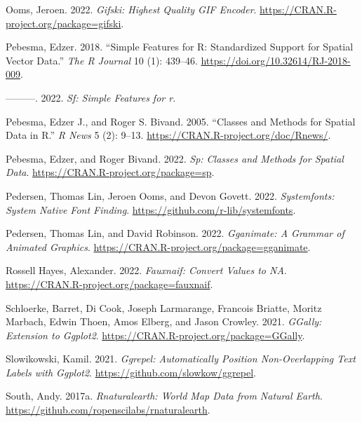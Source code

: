 \documentclass[
]{article}
\newlength{\cslhangindent}
\newlength{\cslentryspacingunit} %
\newenvironment{CSLReferences}[2] %
 {%
  \setlength{\parindent}{0pt}
  \ifodd #1
  \let\oldpar\par
  \def\par{\hangindent=\cslhangindent\oldpar}
  \fi
  \setlength{\parskip}{#2\cslentryspacingunit}
 }%
 {}
\begin{document}
\begin{CSLReferences}{1}{0}
\leavevmode{}%
Ooms, Jeroen. 2022. \emph{Gifski: Highest Quality GIF Encoder}.
\url{https://CRAN.R-project.org/package=gifski}.

\leavevmode{}%
Pebesma, Edzer. 2018. {``{Simple Features for R: Standardized Support
for Spatial Vector Data}.''} \emph{{The R Journal}} 10 (1): 439--46.
\url{https://doi.org/10.32614/RJ-2018-009}.

\leavevmode{}%
---------. 2022. \emph{Sf: Simple Features for r}.

\leavevmode{}%
Pebesma, Edzer J., and Roger S. Bivand. 2005. {``Classes and Methods for
Spatial Data in {R}.''} \emph{R News} 5 (2): 9--13.
\url{https://CRAN.R-project.org/doc/Rnews/}.

\leavevmode{}%
Pebesma, Edzer, and Roger Bivand. 2022. \emph{Sp: Classes and Methods
for Spatial Data}. \url{https://CRAN.R-project.org/package=sp}.

\leavevmode{}%
Pedersen, Thomas Lin, Jeroen Ooms, and Devon Govett. 2022.
\emph{Systemfonts: System Native Font Finding}.
\url{https://github.com/r-lib/systemfonts}.

\leavevmode{}%
Pedersen, Thomas Lin, and David Robinson. 2022. \emph{Gganimate: A
Grammar of Animated Graphics}.
\url{https://CRAN.R-project.org/package=gganimate}.

\leavevmode{}%
Rossell Hayes, Alexander. 2022. \emph{Fauxnaif: Convert Values to NA}.
\url{https://CRAN.R-project.org/package=fauxnaif}.

\leavevmode{}%
Schloerke, Barret, Di Cook, Joseph Larmarange, Francois Briatte, Moritz
Marbach, Edwin Thoen, Amos Elberg, and Jason Crowley. 2021.
\emph{GGally: Extension to Ggplot2}.
\url{https://CRAN.R-project.org/package=GGally}.

\leavevmode{}%
Slowikowski, Kamil. 2021. \emph{Ggrepel: Automatically Position
Non-Overlapping Text Labels with Ggplot2}.
\url{https://github.com/slowkow/ggrepel}.

\leavevmode{}%
South, Andy. 2017a. \emph{Rnaturalearth: World Map Data from Natural
Earth}. \url{https://github.com/ropenscilabs/rnaturalearth}.


\end{CSLReferences}
\end{document}
